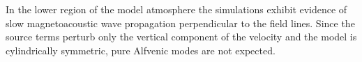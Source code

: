 \documentclass[linenumbers]{aastex63}
\begin{document}
 In the lower region of the model atmosphere the simulations exhibit evidence of slow magnetoacoustic wave propagation perpendicular to the field lines. Since the source terms perturb only the vertical component of the velocity and the model is cylindrically symmetric, pure Alfvenic modes are not expected. 











\end{document}
